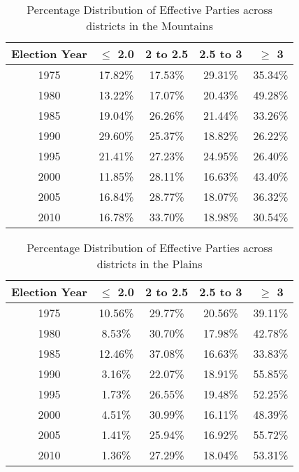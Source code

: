 \begin{table}[h]
    \centering
    \begin{tabular}{|c|c|c|c|c|}
    \hline
    Election Year & $\leq$ 2.0 & 2 to 2.5 & 2.5 to 3 & $\geq$ 3 \\ \hline
    1975 & 17.82\% & 17.53\% & 29.31\% & 35.34\% \\ \hline
    1980 & 13.22\% & 17.07\% & 20.43\% & 49.28\% \\ \hline
    1985 & 19.04\% & 26.26\% & 21.44\% & 33.26\% \\ \hline
    1990 & 29.60\% & 25.37\% & 18.82\% & 26.22\% \\ \hline
    1995 & 21.41\% & 27.23\% & 24.95\% & 26.40\% \\ \hline
    2000 & 11.85\% & 28.11\% & 16.63\% & 43.40\% \\ \hline
    2005 & 16.84\% & 28.77\% & 18.07\% & 36.32\% \\ \hline
    2010 & 16.78\% & 33.70\% & 18.98\% & 30.54\% \\ \hline
    \end{tabular}
    \caption{Percentage Distribution of Effective Parties across districts in the Mountains}
    \label{tab:assembly_mountain_percentage_district}
    \end{table}

    \begin{table}[h]
        \centering
        \begin{tabular}{|c|c|c|c|c|}
        \hline
        Election Year & $\leq$ 2.0 & 2 to 2.5 & 2.5 to 3 & $\geq$ 3 \\ \hline
        1975 & 10.56\% & 29.77\% & 20.56\% & 39.11\% \\ \hline
        1980 & 8.53\% & 30.70\% & 17.98\% & 42.78\% \\ \hline
        1985 & 12.46\% & 37.08\% & 16.63\% & 33.83\% \\ \hline
        1990 & 3.16\% & 22.07\% & 18.91\% & 55.85\% \\ \hline
        1995 & 1.73\% & 26.55\% & 19.48\% & 52.25\% \\ \hline
        2000 & 4.51\% & 30.99\% & 16.11\% & 48.39\% \\ \hline
        2005 & 1.41\% & 25.94\% & 16.92\% & 55.72\% \\ \hline
        2010 & 1.36\% & 27.29\% & 18.04\% & 53.31\% \\ \hline
        \end{tabular}
        \caption{Percentage Distribution of Effective Parties across districts in the Plains}
        \label{tab:assembly_plains_percentage_district}
        \end{table}
        
